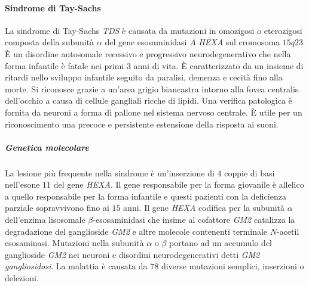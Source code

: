 \paragraph{Sindrome di Tay-Sachs}
La sindrome di Tay-Sachs \emph{TDS} \`e causata da mutazioni in omozigosi o eterozigosi composta della subunit\`a $\alpha$ del gene esosaminidasi $A$ \emph{HEXA} sul cromosoma $15q23$
\`E un disordine autosomale recessivo e progressivo neurodegenerativo che nella forma infantile \`e fatale nei primi $3$ anni di vita. \`E caratterizzato da un insieme di ritardi
nello sviluppo infantile seguito da paralisi, demenza e cecit\`a fino alla morte. Si riconosce grazie a un'area grigio biancastra intorno alla fovea centralis dell'occhio a causa di 
cellule gangliali ricche di lipidi. Una verifica patologica \`e fornita da neuroni a forma di pallone nel sistema nervoso centrale. \`E utile per un riconoscimento una precoce e 
persistente estensione della risposta ai suoni. 
\subparagraph{Genetica molecolare}
La lesione pi\`u frequente nella sindrome \`e un'inserzione di $4$ coppie di basi nell'esone $11$ del gene \emph{HEXA}. Il gene responsabile per la forma giovanile \`e allelico a quello
responsabile per la forma infantile e questi pazienti con la deficienza parziale sopravvivono fino ai $15$ anni. Il gene \emph{HEXA} codifica per la subunit\`a $\alpha$ dell'enzima
lisosomale $\beta$-esosaminidasi che insime al cofattore \emph{GM2} catalizza la degradazione del ganglioside \emph{GM2} e altre molecole contenenti terminale $N$-acetil esosaminasi. 
Mutazioni nella subunit\`a $\alpha$ o $\beta$ portano ad un accumulo del ganglioside \emph{GM2} nei neuroni e disordini neurodegenerativi detti \emph{GM2 gangliosidosi}. La malattia 
\`e causata da $78$ diverse mutazioni semplici, inserzioni o delezioni.
